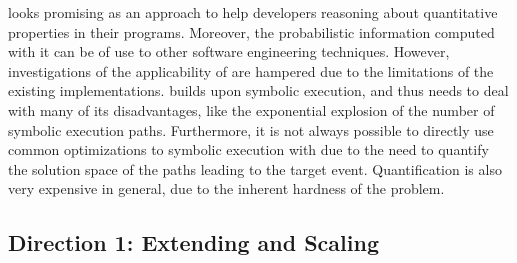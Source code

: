 \documentclass[10pt]{article}
\newcounter{list}
\begin{document}
\PSE{} looks promising as an approach to help developers reasoning
about quantitative properties in their programs. Moreover, the
probabilistic information computed with it can be of use to other
software engineering techniques. However, investigations of the
applicability of \PSE{} are hampered due to the limitations of the
existing implementations. \PSE{} builds upon symbolic execution, and
thus needs to deal with many of its disadvantages, like the
exponential explosion of the number of symbolic execution
paths. Furthermore, it is not always possible to directly use
common optimizations to symbolic execution with \PSE{} due to the need to
quantify the solution space of the paths leading to the target
event. Quantification is also very expensive in general, due to the
inherent hardness of the problem.





\vspace{-4mm}
\subsection{Direction 1: Extending and Scaling \PSE{}}
\end{document}
